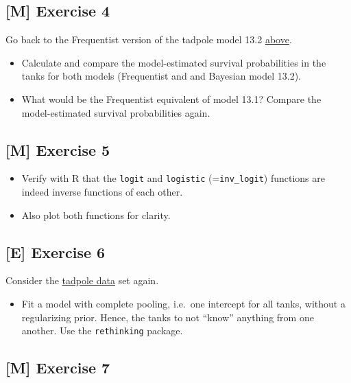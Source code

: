 \documentclass[
]{book}
\providecommand{\tightlist}{%
  \setlength{\itemsep}{0pt}\setlength{\parskip}{0pt}}
\begin{document}
\subsection{{[}M{]} Exercise 4}\label{exercise4_LMM}

Go back to the Frequentist version of the tadpole model 13.2 \hyperref[frequentist13_2]{above}.

\begin{itemize}
\tightlist
\item
  Calculate and compare the model-estimated survival probabilities in the tanks for
  both models (Frequentist and and Bayesian model 13.2).
\item
  What would be the Frequentist equivalent of model 13.1?
  Compare the model-estimated survival probabilities again.
\end{itemize}

\subsection{{[}M{]} Exercise 5}\label{exercise5_LMM}

\begin{itemize}
\tightlist
\item
  Verify with R that the \texttt{logit} and \texttt{logistic} (=\texttt{inv\_logit}) functions are indeed
  inverse functions of each other.
\item
  Also plot both functions for clarity.
\end{itemize}

\subsection{{[}E{]} Exercise 6}\label{exercise6_LMM}

Consider the \hyperref[tadpole]{tadpole data} set again.

\begin{itemize}
\tightlist
\item
  Fit a model with complete pooling, i.e.~one intercept for all tanks, without a regularizing prior.
  Hence, the tanks to not ``know'' anything from one another. Use the \texttt{rethinking} package.
\end{itemize}

\subsection{{[}M{]} Exercise 7}\label{exercise7_LMM}
\end{document}

